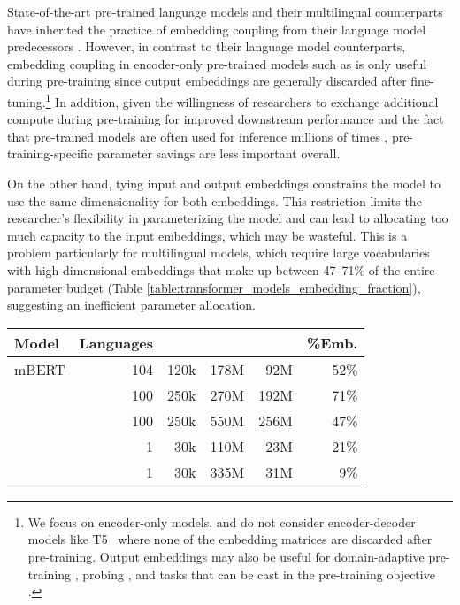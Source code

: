 \documentclass{article} \usepackage{iclr2021_conference,times}
\begin{document}
State-of-the-art pre-trained language models \citep{Devlin2019,Liu2019roberta} and their multilingual counterparts \citep{Devlin2019,Conneau2020} have inherited the practice of embedding coupling from their language model predecessors \citep{Press2017,Inan2017}. However, in contrast to their language model counterparts, embedding coupling in encoder-only pre-trained models such as \citet{Devlin2019} is only useful during pre-training since output embeddings are generally discarded after fine-tuning.\footnote{We focus on encoder-only models, and do not consider encoder-decoder models like T5~\citep{Raffel2020} where none of the embedding matrices are discarded after pre-training. Output embeddings may also be useful for domain-adaptive pre-training \citep{Howard2018,Gururangan2020dontstop}, probing \citep{Elazar2019olmpics}, and tasks that can be cast in the pre-training objective \citep{amrami2019towards}.} In addition, given the willingness of researchers to exchange additional compute during pre-training for improved downstream performance \citep{Raffel2020,Brown2020} and the fact that pre-trained models are often used for inference millions of times \citep{Wolf2019transformers}, pre-training-specific parameter savings are less important overall.

On the other hand, tying input and output embeddings constrains the model to use the same dimensionality for both embeddings. 
This restriction limits the researcher's flexibility in parameterizing the model and can lead to allocating too much capacity to the input embeddings, which may be wasteful.
This is a problem particularly for multilingual models, which require large vocabularies with high-dimensional embeddings that make up between 47--71\% of the entire parameter budget (Table \ref{table:transformer_models_embedding_fraction}), suggesting an inefficient parameter allocation.


\begin{table*}[t]
\caption{Overview of the number of parameters in (coupled) embedding matrices of state-of-the-art multilingual (top) and monolingual (bottom) models with regard to overall parameter budget. : vocabulary size. , : number of parameters in total and in the embedding matrix respectively.
}
\label{table:transformer_models_embedding_fraction}
\begin{center}
\begin{tabular}{lrrrrr}
\toprule
\textbf{Model} &
\multicolumn{1}{c}{Languages} &
\multicolumn{1}{c}{} &
\multicolumn{1}{c}{} &
\multicolumn{1}{c}{} &
\multicolumn{1}{c}{\%Emb.} \\
\midrule
mBERT \citep{Devlin2019} & 104 & 120k & 178M &  92M &  52\% \\
 \citep{Conneau2020} &   100 & 250k & 270M & 192M &  71\% \\
 \citep{Conneau2020} &   100 & 250k & 550M & 256M &  47\% \\
\midrule
 \citep{Devlin2019} & 1 & 30k & 110M & 23M & 21\% \\
 \citep{Devlin2019} & 1 &  30k & 335M &  31M &   9\% \\
\bottomrule
\end{tabular}
\end{center}
\end{table*}
\end{document}
